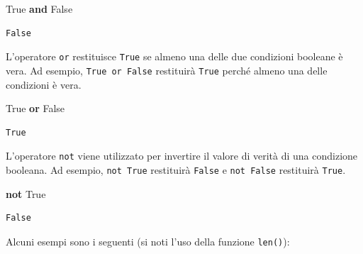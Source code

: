 \documentclass[
  letterpaper,
  krantz2]{{[}./krantz{]}}
\newenvironment{Shaded}{\begin{snugshade}}{\end{snugshade}}
\newcommand{\KeywordTok}[1]{\textcolor[rgb]{0.00,0.23,0.31}{\textbf{#1}}}
\newcommand{\VariableTok}[1]{\textcolor[rgb]{0.07,0.07,0.07}{#1}}
\begin{document}
\begin{Shaded}
\begin{Highlighting}[]
\VariableTok{True} \KeywordTok{and} \VariableTok{False}
\end{Highlighting}
\end{Shaded}

\begin{verbatim}
False
\end{verbatim}

L'operatore \texttt{or} restituisce \texttt{True} se almeno una delle
due condizioni booleane è vera. Ad esempio, \texttt{True\ or\ False}
restituirà \texttt{True} perché almeno una delle condizioni è vera.

\begin{Shaded}
\begin{Highlighting}[]
\VariableTok{True} \KeywordTok{or} \VariableTok{False}
\end{Highlighting}
\end{Shaded}

\begin{verbatim}
True
\end{verbatim}

L'operatore \texttt{not} viene utilizzato per invertire il valore di
verità di una condizione booleana. Ad esempio, \texttt{not\ True}
restituirà \texttt{False} e \texttt{not\ False} restituirà
\texttt{True}.

\begin{Shaded}
\begin{Highlighting}[]
\KeywordTok{not} \VariableTok{True}
\end{Highlighting}
\end{Shaded}

\begin{verbatim}
False
\end{verbatim}

Alcuni esempi sono i seguenti (si noti l'uso della funzione
\texttt{len()}):
\end{document}
